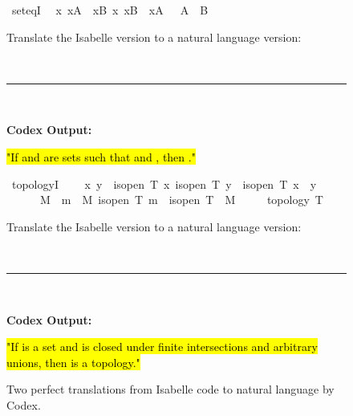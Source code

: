 \documentclass{article}
\begin{document}
\begin{figure}[!t]
    \centering
    \begin{minipage}[c]{0.35\linewidth}
    \begin{boxB}
\begin{isabelle}
\isamarkupfalse \ seteqI{\isacharcolon}{\kern0pt}\isanewline
\ \ {\isachardoublequoteopen}{\isasymlbrakk}{\isasymAnd}x{\isachardot}{\kern0pt}\ x{\isasymin}A\ {\isasymLongrightarrow}\ x{\isasymin}B{\isacharsemicolon}{\kern0pt}\ {\isasymAnd}x{\isachardot}{\kern0pt}\ x{\isasymin}B\ {\isasymLongrightarrow}\ x{\isasymin}A\ {\isasymrbrakk}\ {\isasymLongrightarrow}\ A\ {\isacharequal}{\kern0pt}\ B{\isachardoublequoteclose}
\end{isabelle}
Translate the Isabelle version to a natural language version:

\
\hrule
\

\textbf{Codex Output:}

\hl{"If  and  are sets such that  and , then ."}
\end{boxB}
\end{minipage}
\begin{minipage}[c]{0.6\linewidth}
\begin{boxB}
\begin{isabelle}
\isamarkupfalse \ topologyI{\isacharcolon}{\kern0pt}\isanewline
\ \ {\isachardoublequoteopen}{\isasymlbrakk}\ {\isasymAnd}\ x\ y{\isachardot}{\kern0pt}\ {\isasymlbrakk}\ is{\isacharunderscore}{\kern0pt}open\ T\ x{\isacharsemicolon}{\kern0pt}\ is{\isacharunderscore}{\kern0pt}open\ T\ y{\isasymrbrakk}\ {\isasymLongrightarrow}\ is{\isacharunderscore}{\kern0pt}open\ T\ {\isacharparenleft}{\kern0pt}x\ {\isasyminter}\ y{\isacharparenright}{\kern0pt}{\isacharsemicolon}{\kern0pt}\isanewline
\ \ \ \ \ {\isasymAnd}\ M{\isachardot}{\kern0pt}\ {\isasymforall}\ m\ {\isasymin}\ M{\isachardot}{\kern0pt}\ is{\isacharunderscore}{\kern0pt}open\ T\ m\ {\isasymLongrightarrow}\ is{\isacharunderscore}{\kern0pt}open\ T\ {\isacharparenleft}{\kern0pt}{\isasymUnion}\ M{\isacharparenright}{\kern0pt}\isanewline
\ \ \ {\isasymrbrakk}\ {\isasymLongrightarrow}\ topology\ T{\isachardoublequoteclose}
\end{isabelle}   
Translate the Isabelle version to a natural language version:

\
\hrule
\

\textbf{Codex Output:}

\hl{"If  is a set and  is closed under finite intersections and arbitrary unions, then  is a topology."}
\end{boxB}
\end{minipage}
\caption{Two perfect translations from Isabelle code to natural language by Codex.}
    \label{fig:examples_informal}
\vspace{-10pt}
\end{figure}
\end{document}
